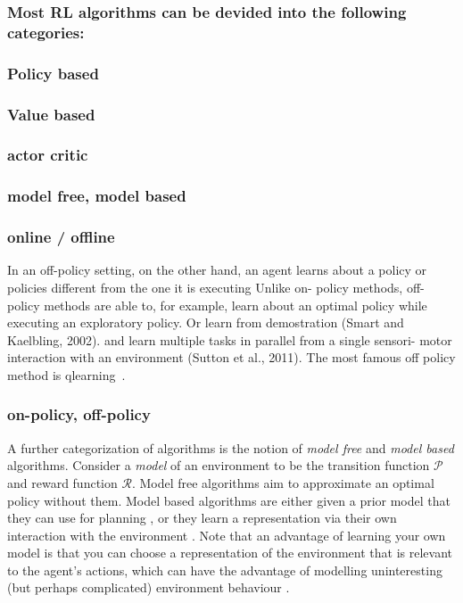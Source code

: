 \documentclass{../main.tex}{subfiles}
\begin{document}
\subsubsection{ Most RL algorithms can be devided into the following categories:}
\subsubsection{ Policy based}
\subsubsection{ Value based}
\subsubsection{ actor critic}
\subsubsection{ model free, model based}
\subsubsection{ online / offline}
In an off-policy setting, on the other hand, an agent learns about a policy or policies different from the one it is executing
Unlike on- policy methods, off-policy methods are able to, for example, learn about an optimal policy while executing an exploratory policy. Or learn from demostration (Smart and Kaelbling, 2002).
and learn multiple tasks in parallel from a single sensori- motor interaction with an environment (Sutton et al., 2011).
The most famous off policy method is qlearning~\citep{Watkins1989}.
\subsubsection{ on-policy, off-policy}

A further categorization of algorithms is the notion of \textit{model free} and \textit{model based} algorithms. Consider a \textit{model} of an environment to be the transition function $\mathcal{P}$ and reward function $\mathcal{R}$. Model free algorithms aim to approximate an optimal policy without them. Model based algorithms are either given a prior model that they can use for planning \citep{browne2012survey, Soemers2014}, or they learn a representation via their own interaction with the environment \citep{Sutton1991, Guzdial2017}. Note that an advantage of learning your own model is that you can choose a representation of the environment that is relevant to the agent's actions, which can have the advantage of modelling uninteresting (but perhaps complicated) environment behaviour \citep{Pathak2017}.
\end{document}
